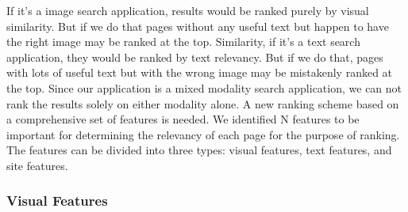 \documentclass{www2010-submission}
\begin{document}
If it's a image search application, results would be ranked purely
by visual similarity. But if we do that pages without any useful
text but happen to have the right image may be ranked at the top.
Similarity, if it's a text search application, they would be
ranked by text relevancy. But if we do that, pages with lots of
useful text but with the wrong image may be mistakenly ranked at
the top. Since our application is a mixed modality search
application, we can not rank the results solely on either modality
alone. A new ranking scheme based on a comprehensive set of
features is needed. We identified N features to be important for
determining the relevancy of each page for the purpose of ranking.
The features can be divided into three types: visual features,
text features, and site features.

\subsubsection{Visual Features}
\end{document}
